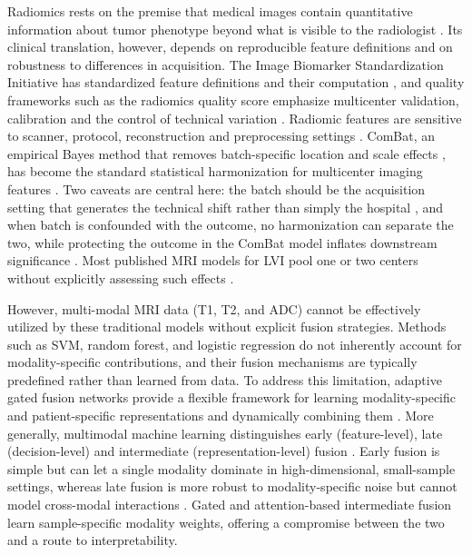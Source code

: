 \documentclass[conference]{IEEEtran}
\begin{document}
Radiomics rests on the premise that medical images contain quantitative information about tumor phenotype beyond what is visible to the radiologist \cite{gillies2016radiomics}. Its clinical translation, however, depends on reproducible feature definitions and on robustness to differences in acquisition. The Image Biomarker Standardization Initiative has standardized feature definitions and their computation \cite{zwanenburg2020ibsi}, and quality frameworks such as the radiomics quality score emphasize multicenter validation, calibration and the control of technical variation \cite{lambin2017radiomics}. Radiomic features are sensitive to scanner, protocol, reconstruction and preprocessing settings \cite{mali2021radiomics}. ComBat, an empirical Bayes method that removes batch-specific location and scale effects \cite{johnson2007combat}, has become the standard statistical harmonization for multicenter imaging features \cite{fortin2018cortical,orlhac2018postreconstruction,orlhac2022guide}. Two caveats are central here: the batch should be the acquisition setting that generates the technical shift rather than simply the hospital \cite{orlhac2022guide}, and when batch is confounded with the outcome, no harmonization can separate the two, while protecting the outcome in the ComBat model inflates downstream significance \cite{nygaard2016methods,leek2010tackling}. Most published MRI models for LVI pool one or two centers without explicitly assessing such effects \cite{luo2020multiparametric,long2021mri,liu2024multimodal}.

However, multi-modal MRI data (T1, T2, and ADC) cannot be effectively utilized by these traditional models without explicit fusion strategies. Methods such as SVM, random forest, and logistic regression do not inherently account for modality-specific contributions, and their fusion mechanisms are typically predefined rather than learned from data. To address this limitation, adaptive gated fusion networks provide a flexible framework for learning modality-specific and patient-specific representations and dynamically combining them \cite{zhou2025agfnet}.
More generally, multimodal machine learning distinguishes early (feature-level), late (decision-level) and intermediate (representation-level) fusion \cite{baltrusaitis2019multimodal}. Early fusion is simple but can let a single modality dominate in high-dimensional, small-sample settings, whereas late fusion is more robust to modality-specific noise but cannot model cross-modal interactions \cite{pereira2023comparative}. Gated and attention-based intermediate fusion learn sample-specific modality weights, offering a compromise between the two and a route to interpretability.
\end{document}
